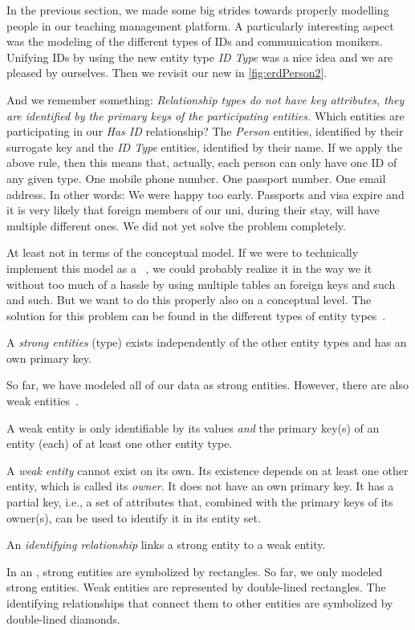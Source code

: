 %
%
%
In the previous section, we made some big strides towards properly modelling people in our teaching management platform.
A particularly interesting aspect was the modeling of the different types of IDs and communication monikers.
Unifying IDs by using the new entity type \emph{ID Type} was a nice idea and we are pleased by ourselves.
Then we revisit our new  in \cref{fig:erdPerson2}.

And we remember something:
\emph{Relationship types do not have key attributes, they are identified by the primary keys of the participating entities.}
Which entities are participating in our \emph{Has ID} relationship?
The \emph{Person} entities, identified by their surrogate key and the \emph{ID Type} entities, identified by their name.
If we apply the above rule, then this means that, actually, each person can only have one ID of any given type.
One mobile phone number.
One passport number.
One email address.
In other words:
We were happy too early.
Passports and visa expire and it is very likely that foreign members of our uni, during their stay, will have multiple different ones.
We did not yet solve the problem completely.

At least not in terms of the conceptual model.
If we were to technically implement this model as a \postgresql\ \db, we could probably realize it in the way we  it without too much of a hassle by using multiple tables an foreign keys and such and such.
But we want to do this properly also on a conceptual level.
The solution for this problem can be found in the different types of entity types~\cite{S2024D:CDMERDE}.%
%
\begin{definition}%
A \emph{strong entities} (type) exists independently of the other entity types and has an own primary key.%
\end{definition}%
%
So far, we have modeled all of our data as strong entities.
However, there are also weak entities~\cite{P2006CITRD:CERDTRM,SS2005EIDDDFDB:CDDICAMP,S2024D:CDMERDE}.%
%
\begin{definition}%
A weak entity is only identifiable by its values \emph{and} the primary key(s) of an entity (each) of at least one other entity type.%
\end{definition}%
%
A \emph{weak entity} cannot exist on its own.
Its existence depends on at least one other entity, which is called its \emph{owner}.
It does not have an own primary key.
It has a partial key, i.e., a set of attributes that, combined with the primary keys of its owner(s), can be used to identify it in its entity set.%
%
\begin{definition}%
An \emph{identifying relationship} links a strong entity to a weak entity.%
\end{definition}%
%
In an , strong entities are symbolized by rectangles.
So far, we only modeled strong entities.
Weak entities are represented by double-lined rectangles.
The identifying relationships that connect them to other entities are symbolized by double-lined diamonds.

